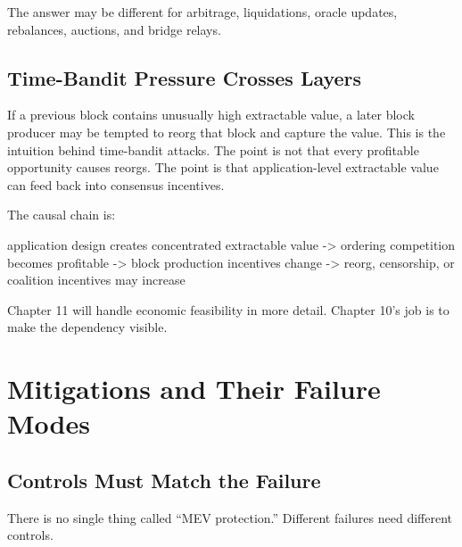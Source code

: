 The answer may be different for arbitrage, liquidations, oracle updates, rebalances, auctions, and bridge relays.

\subsection{Time-Bandit Pressure Crosses Layers}

If a previous block contains unusually high extractable value, a later block producer may be tempted to reorg that block and capture the value. This is the intuition behind time-bandit attacks. The point is not that every profitable opportunity causes reorgs. The point is that application-level extractable value can feed back into consensus incentives.

The causal chain is:

\begin{codeblock}
application design creates concentrated extractable value
-> ordering competition becomes profitable
-> block production incentives change
-> reorg, censorship, or coalition incentives may increase
\end{codeblock}

Chapter 11 will handle economic feasibility in more detail. Chapter 10's job is to make the dependency visible.

\section{Mitigations and Their Failure Modes}

\subsection{Controls Must Match the Failure}

There is no single thing called ``MEV protection.'' Different failures need different controls.

